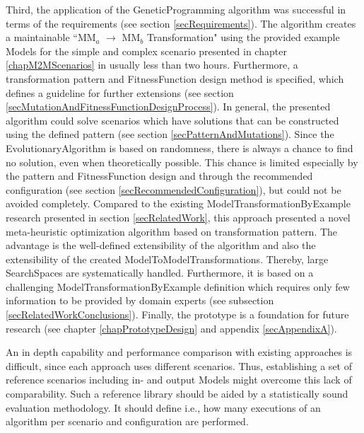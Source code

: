 Third, the application of the \gls{GeneticProgramming} algorithm was successful in terms of the requirements (see section \ref{secRequirements}). The algorithm creates a maintainable ``MM$_a$ $\rightarrow$ MM$_b$ Transformation" using the provided example \glspl{Model} for the simple and complex scenario presented in chapter \ref{chapM2MScenarios} in usually less than two hours. Furthermore, a transformation pattern and \gls{FitnessFunction} design method is specified, which defines a guideline for further extensions (see section \ref{secMutationAndFitnessFunctionDesignProcess}). In general, the presented algorithm could solve scenarios which have solutions that can be constructed using the defined pattern (see section \ref{secPatternAndMutations}). Since the \gls{EvolutionaryAlgorithm} is based on randomness, there is always a chance to find no solution, even when theoretically possible. This chance is limited especially by the pattern and \gls{FitnessFunction} design and through the recommended configuration (see section \ref{secRecommendedConfiguration}), but could not be avoided completely. Compared to the existing \gls{ModelTransformationByExample} research presented in section \ref{secRelatedWork}, this approach presented a novel meta-heuristic optimization algorithm based on transformation pattern. The advantage is the well-defined extensibility of the algorithm and also the extensibility of the created \glspl{ModelToModelTransformation}. Thereby, large \glspl{SearchSpace} are systematically handled. Furthermore, it is based on a challenging \gls{ModelTransformationByExample} definition which requires only few information to be provided by domain experts (see subsection \ref{secRelatedWorkConclusions}). Finally, the prototype is a foundation for future research (see chapter \ref{chapPrototypeDesign} and appendix \ref{secAppendixA}).


An in depth capability and performance comparison with existing approaches is difficult, since each approach uses different scenarios. Thus, establishing a set of reference scenarios including in- and output \glspl{Model} might overcome this lack of comparability. Such a reference library should be aided by a statistically sound evaluation methodology. It should define i.e., how many executions of an algorithm per scenario and configuration are performed. %

